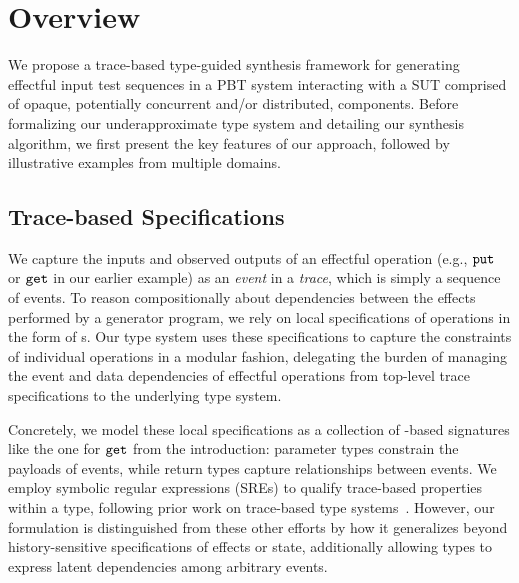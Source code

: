 \section{Overview}\label{sec:overview}

We propose a trace-based type-guided synthesis framework for
generating effectful input test sequences in a PBT system interacting
with a SUT comprised of opaque, potentially concurrent and/or
distributed, components.  Before formalizing our underapproximate type
system and detailing our synthesis algorithm, we first present the key
features of our approach, followed by illustrative examples from
multiple domains.

\subsection{Trace-based Specifications}

We capture the inputs and observed outputs of an effectful operation
(e.g., $\boldsymbol{{\tt put}}$ or $\boldsymbol{{\tt get}}$ in our earlier example) as an
\emph{event} in a \emph{trace}, which is simply a sequence of events.
To reason compositionally about dependencies between the effects
performed by a generator program, we rely on local specifications of
operations in the form of \tyName{}s.  Our type system uses these
specifications to capture the constraints of individual operations in
a modular fashion, delegating the burden of managing the event and
data dependencies of effectful operations from top-level trace
specifications to the underlying type system.

Concretely, we model these local specifications as a collection of
\tyName{}-based signatures like the one for $\boldsymbol{{\tt get}}$ from the
introduction: parameter types constrain the payloads of events, while
return types capture relationships between events. We employ symbolic
regular expressions (SREs) to qualify trace-based properties within a
type, following prior work on trace-based type
systems~\cite{KT+14,ZYDJ24,NUKT+18}. However, our formulation is
distinguished from these other efforts by how it generalizes beyond
history-sensitive specifications of effects or state, additionally
allowing types to express latent dependencies among arbitrary events.



